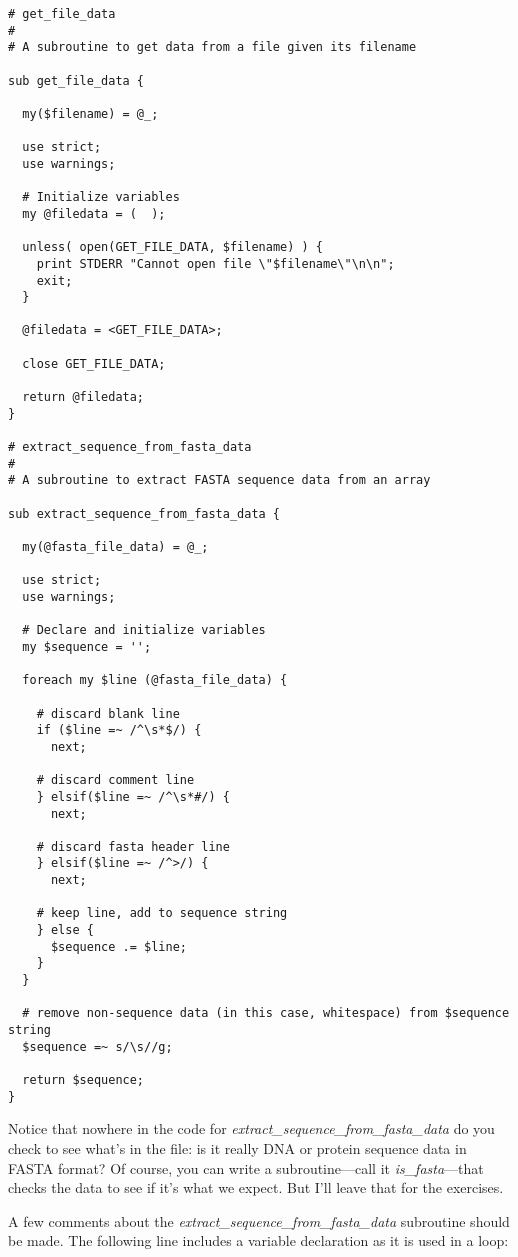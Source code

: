 \begin{lstlisting}
# get_file_data
#
# A subroutine to get data from a file given its filename

sub get_file_data {

  my($filename) = @_;

  use strict;
  use warnings;

  # Initialize variables
  my @filedata = (  );

  unless( open(GET_FILE_DATA, $filename) ) {
    print STDERR "Cannot open file \"$filename\"\n\n";
    exit;
  }

  @filedata = <GET_FILE_DATA>;

  close GET_FILE_DATA;

  return @filedata;
}

# extract_sequence_from_fasta_data
#
# A subroutine to extract FASTA sequence data from an array

sub extract_sequence_from_fasta_data {

  my(@fasta_file_data) = @_;

  use strict;
  use warnings;

  # Declare and initialize variables
  my $sequence = '';

  foreach my $line (@fasta_file_data) {

    # discard blank line
    if ($line =~ /^\s*$/) {
      next;

    # discard comment line
    } elsif($line =~ /^\s*#/) {
      next;

    # discard fasta header line
    } elsif($line =~ /^>/) {
      next;

    # keep line, add to sequence string
    } else {
      $sequence .= $line;
    }
  }

  # remove non-sequence data (in this case, whitespace) from $sequence string
  $sequence =~ s/\s//g;

  return $sequence;
}
\end{lstlisting}

Notice that nowhere in the code for \textit{extract\_sequence\_from\_fasta\_data} do you check to see what's in the file: is it really DNA or protein sequence data in FASTA format?  Of course, you can write a subroutine—call it \textit{is\_fasta}—that checks the data to see if it's what we expect. But I'll leave that for the exercises. 

A few comments about the \textit{extract\_sequence\_from\_fasta\_data} subroutine should be made. The following line includes a variable declaration as it is used in a loop: 

